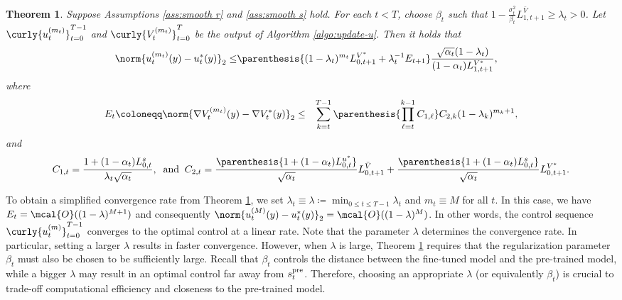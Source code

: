 \documentclass{article}
\newtheorem{Theorem}{Theorem}[section]
\begin{document}
\begin{Theorem}\label{thm:convergence}
Suppose Assumptions \ref{ass:smooth r} and \ref{ass:smooth s} hold. 
    For each $t < T$, choose $\beta_t$ such that $ 1 - \frac{\sigma_t^2}{\beta_t}L_{1, t+1}^{\bar{V}} \geq \lambda_{t} > 0  $. Let $\curly{u_t^{(m_t)}}_{t=0}^{T-1}$ and $\curly{V_t^{(m_t)}}_{t=0}^T$ be the output of Algorithm \ref{algo:update-u}. Then it holds that
\begin{eqnarray}
     \norm{u_t^{(m_t)}(y) - u_t^*(y)}_2  \leq & \parenthesis{(1 - \lambda_t)^{m_t}  L_{0,t+1}^{V^*} + \lambda_t^{-1}E_{t+1}}  \frac{\sqrt{\alpha_{t}}(1 - \lambda_t)}{(1 - \alpha_{t})L_{1, t+1}^{V^*}}, 
\end{eqnarray}
where
\begin{eqnarray}
        E_{t} \coloneqq \norm{\nabla V_t^{(m_t)}(y) - \nabla V_t^{*}(y)}_2  &\leq & \sum_{k = t}^{T - 1} \parenthesis{\prod_{\ell = t}^{k - 1}C_{1, \ell}} C_{2, k} (1 - \lambda_k)^{m_k + 1}, \label{eq:Et}
\end{eqnarray}
and 
\begin{align*}
    C_{1,t} =  \frac{1 + (1 - \alpha_t)L_{0, t}^{s}}{\lambda_t\sqrt{\alpha_t}} , \;\; \text{and} \;\; C_{2, t} = \frac{\parenthesis{1 + (1 - \alpha_t)L_{0, t}^{u^*}}}{\sqrt{\alpha_t}}L_{0, t+1}^{\bar{V}} +  \frac{\parenthesis{1 + (1 - \alpha_t)L_{0, t}^{s}}}{\sqrt{\alpha_t}}L_{0, t+1}^{V^*}.
\end{align*}
\end{Theorem}
   
   To obtain a simplified convergence rate from Theorem \ref{thm:convergence}, we set  $\lambda_t \equiv \lambda \coloneqq \min_{0\leq t\leq T-1} \lambda_t$ and $m_t \equiv M$ for all $t$. In this case, we have $E_t = \mcal{O}((1 - \lambda)^{M+1})$ and consequently $\norm{u_t^{(M)}(y) - u_t^*(y)}_2 = \mcal{O}((1 - \lambda)^{M})$. In other words, the control sequence $\curly{u_t^{(m)}}_{t=0}^{T-1}$ converges to the optimal control at a linear rate. Note that the parameter $\lambda$ determines the convergence rate. In particular, setting a larger 
 $ \lambda$ results in faster convergence. However, when 
$\lambda$ is large, Theorem \ref{thm:convergence} requires that the regularization parameter 
$\beta_t$ must also be chosen to be sufficiently large. Recall that $\beta_t$ controls the distance between the fine-tuned model and the pre-trained model, while a bigger $\lambda$ may result in an optimal control far away from $s_t^{\rm pre}$. Therefore, choosing an appropriate $\lambda$ (or equivalently $\beta_t$) is crucial to trade-off computational efficiency and closeness to the pre-trained model.
\end{document}
